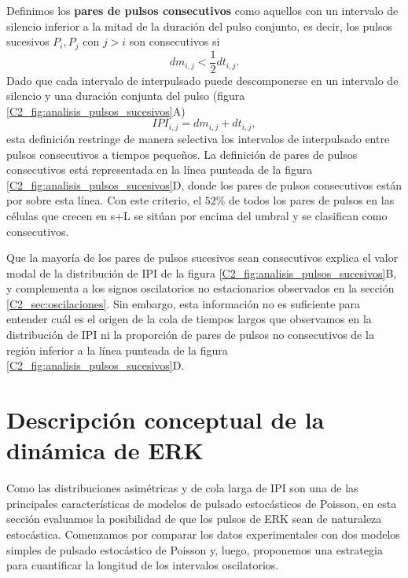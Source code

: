 \documentclass[./main.tex]{subfiles}
\begin{document}
Definimos los \textbf{pares de pulsos consecutivos} como aquellos con un intervalo de silencio inferior a la mitad de la duración del pulso conjunto, es decir, los pulsos sucesivos $P_i, P_j$ con $j >i$ son consecutivos si
\begin{equation}
    dm_{i,j} < \frac{1}{2} dt_{i,j}.
\end{equation} 
Dado que cada intervalo de interpulsado puede descomponerse en un intervalo de silencio y una duración conjunta del pulso (figura \ref{C2_fig:analisis_pulsos_sucesivos}A)
\begin{equation}
    IPI_{i,j} = dm_{i,j} + dt_{i,j},
\end{equation}
esta definición restringe de manera selectiva los intervalos de interpulsado entre pulsos consecutivos a tiempos pequeños. La definición de pares de pulsos consecutivos está representada en la línea punteada de la figura \ref{C2_fig:analisis_pulsos_sucesivos}D, donde los pares de pulsos consecutivos están por sobre esta línea. Con este criterio, el $52\%$ de todos los pares de pulsos en las células que crecen en s+L se sitúan por encima del umbral y se clasifican como consecutivos. 


Que la mayoría de los pares de pulsos sucesivos sean consecutivos explica el valor modal de la distribución de IPI de la figura \ref{C2_fig:analisis_pulsos_sucesivos}B, y complementa a los signos oscilatorios no estacionarios observados en la sección \ref{C2_sec:oscilaciones}. Sin embargo, esta información no es suficiente para entender cuál es el origen de la cola de tiempos largos que observamos en la distribución de IPI ni la proporción de pares de pulsos no consecutivos de la región inferior a la línea punteada de la figura \ref{C2_fig:analisis_pulsos_sucesivos}D.


\section{Descripción conceptual de la dinámica de ERK}
\label{C2_sec:pulsado_estoctastico}

Como las distribuciones asimétricas y de cola larga de IPI son una de las principales características de modelos de pulsado estocásticos de Poisson, en esta sección evaluamos la posibilidad de que los pulsos de ERK sean de naturaleza estocástica. Comenzamos por comparar los datos experimentales con dos modelos simples de pulsado estocástico de Poisson y, luego, proponemos una estrategia para cuantificar la longitud de los intervalos oscilatorios. 
\end{document}
